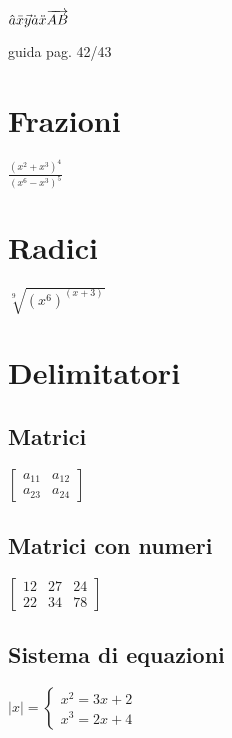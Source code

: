 \documentclass{article}
\begin{document}
$
\hat{a}\\
\bar{x}\\
\vec{y}\\
\dot{a}\\
\ddot{x}\\
\overrightarrow{AB}
$

guida pag. 42/43

\section{Frazioni}

$
\frac{(x^2+x^3)^4}{(x^6-x^3)^5}
$

\section{Radici}

$
\sqrt[9]{(x^6)^(x+3)}
$

\section{Delimitatori}

\subsection{Matrici}

$
\left[
\begin{array}{cc}
    a_{11} & a_{12} \\ a_{23} & a_{24}
\end{array}
\right]
$

\subsection{Matrici con numeri}

$
\left[
\begin{array}{ccc} %
    12 & 27 & 24 \\ 22 & 34 & 78
\end{array}
\right]
$

\subsection{Sistema di equazioni}

$
|x| =
\left\{
\begin{array}{r}
    x^2 = 3x + 2 \\
    x^3 = 2x +4
\end{array}
\right.
$
\end{document}
